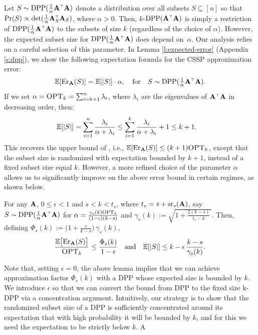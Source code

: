 \documentclass{article}
\begin{document}
Let $S\sim \DPP(\frac1\alpha\A^\top\A)$ denote a
distribution over all subsets $S\subseteq [n]$ so that
$\Pr(S)\propto\det(\frac1\alpha\A_S^\top\A_S)$, where $\alpha>0$. Then,
$k$-$\DPP(\A^\top\A)$ is simply a restriction of
$\DPP(\frac1\alpha\A^\top\A)$ to the subsets of size $k$ (regardless
of the choice of $\alpha$).
However, the expected subset size for $\DPP(\frac1\alpha\A^\top\A)$ does
depend on~$\alpha$. Our analysis relies on a careful selection of
this parameter. In Lemma \ref{l:expected-error}  (Appendix \ref{s:dpp}), we show the
following expectation formula for the CSSP approximation error: 
\[\E[\Er_\A(S)]=\E[|S|]\cdot\alpha,\quad\text{for}\quad S\sim \DPP(\tfrac1\alpha\A^\top\A).\]
If we set $\alpha ={\textsc{OPT}_k} = \sum_{i=k+1}^n\lambda_i$,
where $\lambda_i$ are the eigenvalues of
$\A^\top\A$ in decreasing order, then:
\begin{align*}
 \mathbb E[|S|]& = \sum_{i=1}^n\frac{\lambda_i}{\alpha+\lambda_i}
\leq\sum_{i=1}^k\frac{\lambda_i}{\alpha+\lambda_i} + 1\leq k+1.
\end{align*}
This recovers the upper bound of \citet{pca-volume-sampling}, i.e., $\mathbb E[\mathrm{Er}_\mathbf A(S)]\leq(k+1){\textsc{OPT}_k}$,
except that the
subset size is randomized with expectation bounded by 
$k+1$, instead of a fixed subset size equal $k$. However, a more refined
choice of the parameter $\alpha$
allows us to significantly improve on the above error bound in certain
regimes, as shown below.
\begin{lemma}\label{l:upper}
For any $\mathbf A$, $0\leq\epsilon<1$ and $s<k<t_s$, where $t_s=s+{\mathrm{sr}}_s(\mathbf A)$,
say $S\sim\DPP(\frac1\alpha\A^\top\A)$ for
$\alpha=\frac{\gamma_s(k){\textsc{OPT}_k}}{(1-\epsilon)(k-s)}$ and
$\gamma_s(k):=\sqrt{1+\frac{2(k-s)}{t_s-k}\,}$. Then, defining $\Phi_s(k)
:=\big(1+\frac{s}{k-s}\big)\,\gamma_s(k)$,
\begin{align*}
  \frac{\mathbb E\big[\mathrm{Er}_\mathbf A(S)\big]}{{\textsc{OPT}_k}}\leq \frac{\Phi_s(k)}{1-\epsilon}
  \quad\text{and}\quad \mathbb E[|S|]\leq k-\epsilon\,\frac{k-s}{\gamma_s(k)}.
\end{align*}
  \end{lemma}
Note that, setting $\epsilon=0$, the above lemma implies that we can
achieve approximation factor $\Phi_s(k)$ with a DPP whose expected
size is bounded by $k$. We introduce $\epsilon$ so that we can
convert the bound from DPP to the fixed size k-DPP via a
concentration argument. Intuitively, our strategy is to show that the
randomized subset size of a DPP is sufficiently concentrated around
its expectation that with high probability it will be bounded by $k$,
and for this we need the expectation to be strictly below $k$. A
\end{document}
